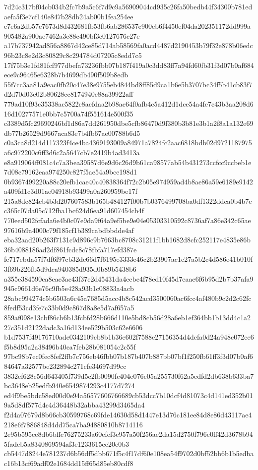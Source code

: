 \documentclass[11pt,a4paper]{article}
\begin{document}
{7d24c317bf04cb034b2fc7b9a5c6f7d9c9a56909044cd935c26fa50bedb44f34300b781edaefa5f3e7cf140e847b28db24ab00b1fea254ee
e7e6a2db57c7673d8d432681fb53fb6ab286537e900eb6f4450ef04da202351172dd999a905482a900ae7462a3c88c490bf3c0127676c27e
a17b737942ad856a8867d42ce85d714ab58569fa0acd4487d2190453b79f32e878b06edc96b23c8e2d3c80829c8c294784d07205c8edd7c5
17f75b3e1fd81fcf977dbefa73236fbb07b187f419a0c3dd83ff7a94fd60fb31f3d07b0af684ece9c96465e6328b7b4699db490f509b8edb
55f7cc3aa81a9eac0fb20c47e38e9755eb4844bd8ff85d9ca1b6e5b3707bc34f5b41cb83f7d2d70d03e02b80628cc8174940e88a39922aff
779ad10f93c35338ac5822c8acfdaa2b98ac64f0afb4c5a412d1dce54a4fe7c43b3aa208d616d10277571e0bb7c5700a74f551614e500f35
c3389d5fc29690246bf1d86a7dd261950dbe5cfb86470d9f380b3b81e3b1a2f8a1a132e69db77b26529d9667aca83e7b4fb67ae00788b6d5
c0a3ca8d214d117323f4ce4ba4369193009a84971a7824fc2aac6818bdb02d9721187975a6c972200c6ff3d6c2a5647cb7e2419b4ad3413a
e8a919064ff081c4c7a3bea39587d6e9d6c26d9b61ca98577ab54b431273ccfcc9ccbeb1e7d08c79162eaa974250c827f5ae54a9bce198d1
0b9367499220a88c20efb1cae40c40838364f72c2b05e974959ad4b8ae86a59e6189e9142a409fd1c3d01ae04918b93499a0a260959be17f
215a8dc824cb4b3d207607583b165b484127f00b7b0376499708ba0df1322ddca0b4b7ec365c07da05c712fba1bc624d6ea91d607454cb4f
770eed502fcfada6e4b0c07e9da9f64a9ef5be9e04e05303310592c8736af7a86e342c65ae97616b9a4000c79f185cf1b389cabdbbdde4af
eba32aad20b263f7131c9d896c9b7663bc8708c31211f1bb1682d8cfc252117e4835e86b36b4088186ad2df861fcdc8c78fbfa717efd387e
fe717ebda57f7df6f97cb32dc66d7f6195e3333e46c2b23907ac1c27a5b2c4d586e41b010f3f69b226fb5d9dca940385d935d0b89b5438b6
a355e384590ca8eae3ac43f37e2d45431da4eebe4f78ed10f45d7eaae6f6b95d2b7b37afa9945c9661d6e76c9fb5e428a93b1c08833a4acb
28abc994274c5b6503a6c45a7685d5acc4b8c542acd3500060ac6fcc4af480b9c2d2c62fc8fedf53cd3fe7c33b0d9c867d8a8e5d7af657a5
859af098e13cbf86cb6b13fcbfd28b666d110e5bd8cb56d28a6eb1ef364bb1b13dd4c1a227c351d2122dadc3a16d134ee529b503c62e6606
b1d7537f49176710ade0342109cb8b1b36e602f7588e27156354d4defa0d24a948c072ce6f5b8d95a2a38496b40ca7feb28b081054c2c55f
97bc98b7ec0fec8fef2ffb7c756eb46fbb07b187b407b887bb07bf1f250fb61ff3f3d07b0af684647a32577be232894c271cfe34697d99cc
3832ef628c56d643405f739d5c2fb0090fc404e076c05a255730f62a5edfd2db638b633ba7bc3648eb25edfb940e6549874293c4177d7274
ed4f9be5bdc58ed00d0e94a56577606766689cb53dcc7b10dcf4d81073c4d141ed352b019a5d8df577d4c4d36448b32abba43299d3465da4
f2d4a07679d8b66cb30599768c69fde14630d58d1447e13d76c181ee84d8e86d43117ae4218e6f7886848d4dd75ca7ba94880810b8714116
2e95b595ce8db6bffe76275233a60efef3e957a50f256ae2da15d2750f796e0ff42d3678b945fadeb5a8340869594af3e1233615ee20e0b3
cb5447d8244e781237d6b56df5dbb671f5c4f17df60e108ea54f9702d0bf52bb6b1b5edbac16b13cf69adf02e1684dd15ff65d85eb80cdf8
}
\end{document}
